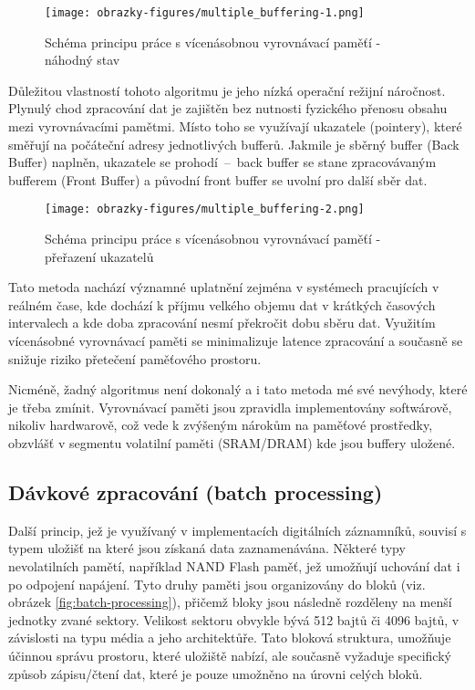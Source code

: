 \begin{figure}[h]
    \centering
    \texttt{[image: obrazky-figures/multiple\_buffering-1.png]}
    
    \caption{Schéma principu práce s vícenásobnou vyrovnávací paměťí - náhodný stav}
    \label{fig:multiple-buffering-1}
\end{figure}

Důležitou vlastností tohoto algoritmu je jeho nízká operační režijní náročnost. Plynulý chod zpracování dat je zajištěn bez nutnosti fyzického přenosu obsahu mezi vyrovnávacími pamětmi. 
Místo toho se využívají ukazatele (pointery), které směřují na počáteční adresy jednotlivých bufferů. Jakmile je sběrný buffer (Back Buffer) naplněn, ukazatele se prohodí~–~back buffer se 
stane zpracovávaným bufferem (Front Buffer) a původní front buffer se uvolní pro další sběr dat.

\begin{figure}[h]
    \centering
    \texttt{[image: obrazky-figures/multiple\_buffering-2.png]}
    
    \caption{Schéma principu práce s vícenásobnou vyrovnávací paměťí - přeřazení ukazatelů}
    \label{fig:multiple-buffering-2}
\end{figure}

Tato metoda nachází významné uplatnění zejména v systémech pracujících v reálném čase, kde dochází k příjmu velkého objemu dat v krátkých časových intervalech a kde doba zpracování nesmí 
překročit dobu sběru dat. Využitím vícenásobné vyrovnávací paměti se minimalizuje latence zpracování a současně se snižuje riziko přetečení paměťového prostoru. \cite{buffering_chang}

Nicméně, žadný algoritmus není dokonalý a i tato metoda mé své nevýhody, které je třeba zmínit. Vyrovnávací paměti jsou zpravidla implementovány softwárově, nikoliv hardwarově, což vede 
k zvýšeným nárokům na paměťové prostředky, obzvlášť v segmentu volatilní paměti (SRAM/DRAM) kde jsou buffery uložené. \cite{basics_of_digital_forensics}

\subsection{Dávkové zpracování (batch processing)}
Další princip, jež je využívaný v implementacích digitálních záznamníků, souvisí s typem uložišť na které jsou získaná data zaznamenávána. Některé typy nevolatilních pamětí, například NAND 
Flash paměť, jež umožňují uchování dat i po odpojení napájení. Tyto druhy paměti jsou organizovány do bloků (viz. obrázek \ref{fig:batch-processing}), přičemž bloky jsou následně rozděleny 
na menší jednotky zvané sektory. Velikost sektoru obvykle bývá 512 bajtů či 4096 bajtů, v závislosti na typu média a jeho architektůře. Tato bloková struktura, umožňuje účinnou správu prostoru, 
které uložiště nabízí, ale současně vyžaduje specifický způsob zápisu/čtení dat, které je pouze umožněno na úrovni celých bloků.  \cite{tech_target_nand_flash, non_volatile_memories}

